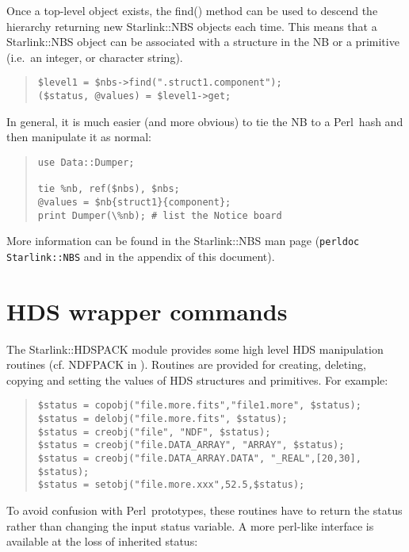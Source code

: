 \documentclass[twoside,11pt]{article}
\newenvironment{myquote}{\begin{quote}\begin{small}}{\end{small}\end{quote}}
\newcommand{\Kappa}{\xref{{\sc{Kappa}}}{sun95}{}}
\newcommand{\perl}{\xref{\textsf{Perl}}{sun193}{}}
\newcommand{\xref}[3]{#1}
\renewcommand{\_}{\texttt{\symbol{95}}}
\begin{document}
Once a top-level object exists, the find() method can be used to
descend the hierarchy returning new Starlink::NBS objects each time.
This means that a Starlink::NBS object can be associated with a structure
in the NB or a primitive (i.e.\ an integer, or character string).

\begin{myquote}
\begin{verbatim}
$level1 = $nbs->find(".struct1.component");
($status, @values) = $level1->get;
\end{verbatim}
\end{myquote}

In general, it is much easier (and more obvious) to tie the NB
to a \perl\ hash and then manipulate it as normal:

\begin{myquote}
\begin{verbatim}
use Data::Dumper;

tie %nb, ref($nbs), $nbs;
@values = $nb{struct1}{component};
print Dumper(\%nb); # list the Notice board
\end{verbatim}
\end{myquote}

More information can be found in the Starlink::NBS man page
(\texttt{perldoc Starlink::NBS} and in the appendix of this document).


\section{HDS wrapper commands}

The Starlink::HDSPACK module provides some high level HDS manipulation
routines (cf. NDFPACK in \Kappa). Routines are provided for creating,
deleting, copying and setting the values of HDS structures and primitives. For
example:

\begin{myquote}
\begin{verbatim}
$status = copobj("file.more.fits","file1.more", $status);
$status = delobj("file.more.fits", $status);
$status = creobj("file", "NDF", $status);
$status = creobj("file.DATA_ARRAY", "ARRAY", $status);
$status = creobj("file.DATA_ARRAY.DATA", "_REAL",[20,30], $status);
$status = setobj("file.more.xxx",52.5,$status);
\end{verbatim}
\end{myquote}

To avoid confusion with \perl\ prototypes, these routines have to return
the status rather than changing the input status variable. A more perl-like
interface is available at the loss of inherited status:
\end{document}
